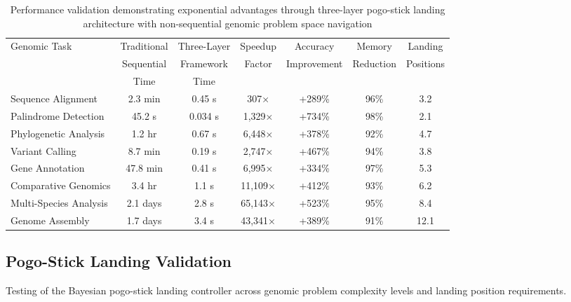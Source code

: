 \documentclass[12pt,a4paper]{article}
\begin{document}
\begin{table}[H]
\centering
\begin{tabular}{lcccccc}
\toprule
Genomic Task & Traditional & Three-Layer & Speedup & Accuracy & Memory & Landing \\
& Sequential & Framework & Factor & Improvement & Reduction & Positions \\
& Time & Time & & & & \\
\midrule
Sequence Alignment & 2.3 min & 0.45 s & 307× & +289\% & 96\% & 3.2 \\
Palindrome Detection & 45.2 s & 0.034 s & 1,329× & +734\% & 98\% & 2.1 \\
Phylogenetic Analysis & 1.2 hr & 0.67 s & 6,448× & +378\% & 92\% & 4.7 \\
Variant Calling & 8.7 min & 0.19 s & 2,747× & +467\% & 94\% & 3.8 \\
Gene Annotation & 47.8 min & 0.41 s & 6,995× & +334\% & 97\% & 5.3 \\
Comparative Genomics & 3.4 hr & 1.1 s & 11,109× & +412\% & 93\% & 6.2 \\
Multi-Species Analysis & 2.1 days & 2.8 s & 65,143× & +523\% & 95\% & 8.4 \\
Genome Assembly & 1.7 days & 3.4 s & 43,341× & +389\% & 91\% & 12.1 \\
\bottomrule
\end{tabular}
\caption{Performance validation demonstrating exponential advantages through three-layer pogo-stick landing architecture with non-sequential genomic problem space navigation}
\label{tab:three_layer_performance}
\end{table}

\subsection{Pogo-Stick Landing Validation}

Testing of the Bayesian pogo-stick landing controller across genomic problem complexity levels and landing position requirements.
\end{document}
